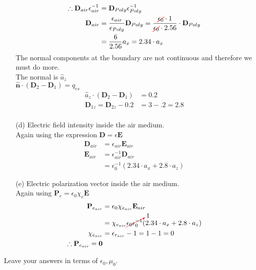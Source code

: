 \documentclass[12pt]{article}
\begin{document}
\begin{itemize}
\begin{align*}
    \therefore \mathbf{D}_{air}\epsilon_{air}^{-1} &=  \mathbf{D}_{Poly}\epsilon_{Poly }^{-1}\\
    \mathbf{D}_{air} &= \frac{\epsilon_{air}}{\epsilon_{Poly}}\mathbf{D}_{Poly} = \frac{\textcolor{red}{\cancel{\textcolor{black}{\epsilon_0}}}\cdot 1}{\textcolor{red}{\cancel{\textcolor{black}{\epsilon_0}}}\cdot 2.56}\cdot \mathbf{D}_{Poly}\\
    &= \frac{6}{2.56}a_x  = 2.34\cdot a_x   
  \end{align*}
  The normal components at the boundary are not continuous and therefore we must do more.\\
  The normal is $\hat a_z$\\
  $\mathbf{\hat n}\cdot (\mathbf{D}_2 - \mathbf{D}_1) = q_{es}$\\
  \begin{align*}
    \hat a_z\cdot (\mathbf{D}_2 - \mathbf{D}_1) &= 0.2 \\
     \mathbf{D}_{1z} = \mathbf{D}_{2z} - 0.2 &= 3-.2 = 2.8\\
  \end{align*}
\item[(d)] Electric field intensity inside the air medium.\\ 
  Again using the expression $\mathbf{D} = \epsilon \mathbf{E}$
  \begin{align*}
    \mathbf{D}_{air} &= \epsilon_{air} \mathbf{E}_{air} \\
    \mathbf{E}_{air} &= \epsilon_{air}^{-1}\mathbf{D}_{air}\\
    &= \epsilon_0^{-1}(2.34\cdot a_x + 2.8\cdot a_z)
  \end{align*}
\item[(e)] Electric polarization vector inside the air medium.\\ 
  Again using $\mathbf{P}_e = \epsilon_0\chi_e\mathbf{E}$\\
  \begin{align*}
    \mathbf{P}_{e_{air}} &= \epsilon_0\chi_{e_{air}}\mathbf{E}_{air}\\
                         &= \chi_{e_{air}}\textcolor{red}{\cancelto{\textcolor{black}{1}}{\textcolor{black}{\epsilon_0\epsilon_0^{-1}}}}(2.34\cdot a_x + 2.8\cdot a_z)\\
    \chi_{e_{air}} &= \epsilon_{r_{air}} - 1 = 1-1=0\\
    \therefore \mathbf{P}_{e_{air}} = \mathbf{0}
  \end{align*}
\end{itemize}
Leave your answers in terms of \( \epsilon_0, \mu_0 \).
\end{document}
